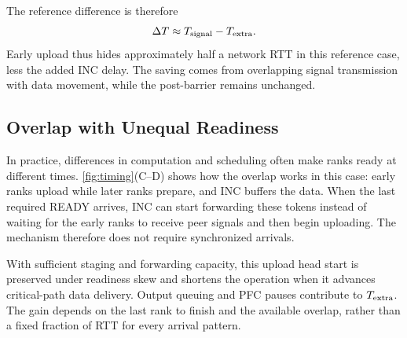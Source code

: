 The reference difference is therefore
\begin{equation}
 \Delta T\approx T_{\rm signal}-T_{\rm extra}.
 \label{eq:gain}
\end{equation}
Early upload thus hides approximately half a network RTT in this reference case, less the added INC delay. The saving comes from overlapping signal transmission with data movement, while the post-barrier remains unchanged.

\subsection{Overlap with Unequal Readiness}
\label{sec:skew}
In practice, differences in computation and scheduling often make ranks ready at different times. \autoref{fig:timing}(C--D) shows how the overlap works in this case: early ranks upload while later ranks prepare, and INC buffers the data. When the last required READY arrives, INC can start forwarding these tokens instead of waiting for the early ranks to receive peer signals and then begin uploading. The mechanism therefore does not require synchronized arrivals.

With sufficient staging and forwarding capacity, this upload head start is preserved under readiness skew and shortens the operation when it advances critical-path data delivery. Output queuing and PFC pauses contribute to $T_{\rm extra}$. The gain depends on the last rank to finish and the available overlap, rather than a fixed fraction of RTT for every arrival pattern.
